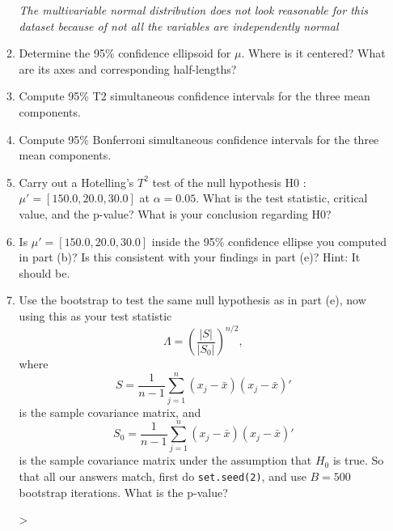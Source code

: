 \documentclass[12pt,a4paper]{paper}
\begin{document}
\begin{enumerate}
\begin{enumerate}
\emph{The multivariable normal distribution does not look reasonable for this dataset because of not all the variables are independently normal}
\item Determine the 95\% confidence ellipsoid for $\mu$. Where is it centered? What are its axes and corresponding half-lengths?
\item Compute 95\% T2 simultaneous confidence intervals for the three mean components.
\item Compute 95\% Bonferroni simultaneous confidence intervals for the three mean components.
\item Carry out a Hotelling's $T^{2}$ test of the null hypothesis H0 : $\mu' = \left[150.0,20.0,30.0\right]$ at $\alpha = 0.05$. What is the test statistic, critical value, and the p-value? What is your conclusion regarding H0?
\item Is $\mu' = [150.0, 20.0, 30.0]$ inside the 95\% confidence ellipse you computed in part (b)? Is this consistent with your findings in part (e)? Hint: It should be.
\item Use the bootstrap to test the same null hypothesis as in part (e), now using this as your test statistic
\[\Lambda = \left(\frac{\left|S\right|}{\left|S_{0}\right|}\right)^{n/2},\]where \[S = \frac{1}{n-1}\sum_{j=1}^{n}(x_{j}-\bar{x})(x_{j}-\bar{x})'\] is the sample covariance matrix, and \[S_{0} = \frac{1}{n-1}\sum_{j=1}^{n}(x_{j}-\bar{x})(x_{j}-\bar{x})'\] is the sample covariance matrix under the assumption that $H_{0}$ is true. So that all our answers match, first do \texttt{set.seed(2)}, and use $B=500$ bootstrap iterations. What is the p-value?
\begin{Schunk}
\begin{Sinput}
> 
\end{Sinput}
\end{Schunk}
\end{enumerate}
\end{enumerate}
\end{document}
